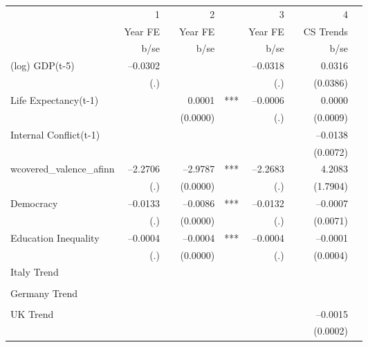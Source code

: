\begin{tabular} {l* {4}{r @{} l}}
\hline
            &           1&   &           2&   &           3&   &           4&   \\
            &     Year FE&   &     Year FE&   &     Year FE&   &   CS Trends&   \\
            &        b/se&   &        b/se&   &        b/se&   &        b/se&   \\
\hline
(log) GDP(t-5)&    --0.0302&   &            &   &    --0.0318&   &      0.0316&   \\
            &         (.)&   &            &   &         (.)&   &    (0.0386)&   \\
Life Expectancy(t-1) &            &   &      0.0001&***&    --0.0006&   &      0.0000&   \\
            &            &   &    (0.0000)&   &         (.)&   &    (0.0009)&   \\
Internal Conflict(t-1)&            &   &            &   &            &   &    --0.0138&   \\
            &            &   &            &   &            &   &    (0.0072)&   \\
wcovered\_valence\_afinn&    --2.2706&   &    --2.9787&***&    --2.2683&   &      4.2083&   \\
            &         (.)&   &    (0.0000)&   &         (.)&   &    (1.7904)&   \\
Democracy   &    --0.0133&   &    --0.0086&***&    --0.0132&   &    --0.0007&   \\
            &         (.)&   &    (0.0000)&   &         (.)&   &    (0.0071)&   \\
Education Inequality&    --0.0004&   &    --0.0004&***&    --0.0004&   &    --0.0001&   \\
            &         (.)&   &    (0.0000)&   &         (.)&   &    (0.0004)&   \\
Italy Trend &            &   &            &   &            &   &            &   \\
            &            &   &            &   &            &   &            &   \\
Germany Trend&            &   &            &   &            &   &            &   \\
            &            &   &            &   &            &   &            &   \\
UK Trend    &            &   &            &   &            &   &    --0.0015&   \\
            &            &   &            &   &            &   &    (0.0002)&   \\

\end{tabular}

